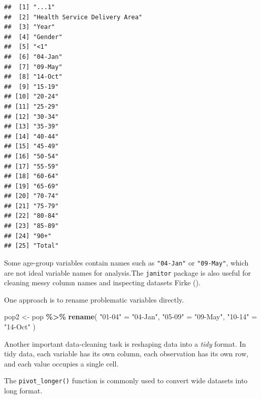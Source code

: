 \documentclass[
  11pt,
  oneside]{book}
\newenvironment{Shaded}{\begin{snugshade}}{\end{snugshade}}
\newcommand{\FunctionTok}[1]{\textcolor[rgb]{0.13,0.29,0.53}{\textbf{#1}}}
\newcommand{\NormalTok}[1]{#1}
\newcommand{\OtherTok}[1]{\textcolor[rgb]{0.56,0.35,0.01}{#1}}
\newcommand{\SpecialCharTok}[1]{\textcolor[rgb]{0.81,0.36,0.00}{\textbf{#1}}}
\newcommand{\StringTok}[1]{\textcolor[rgb]{0.31,0.60,0.02}{#1}}
\begin{document}
\begin{verbatim}
##  [1] "...1"                        
##  [2] "Health Service Delivery Area"
##  [3] "Year"                        
##  [4] "Gender"                      
##  [5] "<1"                          
##  [6] "04-Jan"                      
##  [7] "09-May"                      
##  [8] "14-Oct"                      
##  [9] "15-19"                       
## [10] "20-24"                       
## [11] "25-29"                       
## [12] "30-34"                       
## [13] "35-39"                       
## [14] "40-44"                       
## [15] "45-49"                       
## [16] "50-54"                       
## [17] "55-59"                       
## [18] "60-64"                       
## [19] "65-69"                       
## [20] "70-74"                       
## [21] "75-79"                       
## [22] "80-84"                       
## [23] "85-89"                       
## [24] "90+"                         
## [25] "Total"
\end{verbatim}

Some age-group variables contain names such as \texttt{"04-Jan"} or \texttt{"09-May"}, which are not ideal variable names for analysis.The \texttt{janitor} package is also useful for cleaning messy column names and inspecting datasets Firke ().

One approach is to rename problematic variables directly.

\begin{Shaded}
\begin{Highlighting}[]
\NormalTok{pop2 }\OtherTok{\textless{}{-}}\NormalTok{ pop }\SpecialCharTok{\%\textgreater{}\%}
  \FunctionTok{rename}\NormalTok{(}
    \StringTok{"01{-}04"} \OtherTok{=} \StringTok{"04{-}Jan"}\NormalTok{,}
    \StringTok{"05{-}09"} \OtherTok{=} \StringTok{"09{-}May"}\NormalTok{,}
    \StringTok{"10{-}14"} \OtherTok{=} \StringTok{"14{-}Oct"}
\NormalTok{  )}
\end{Highlighting}
\end{Shaded}

Another important data-cleaning task is reshaping data into a \emph{tidy} format. In tidy data, each variable has its own column, each observation has its own row, and each value occupies a single cell.

The \texttt{pivot\_longer()} function is commonly used to convert wide datasets into long format.
\end{document}
